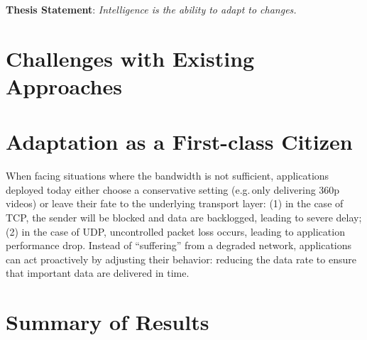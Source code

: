 \documentclass[thesis.tex]{subfiles}
\begin{document}
\vspace{1em}

\noindent\textbf{Thesis Statement}: \textit{Intelligence is the ability to adapt to
  changes.}

\vspace{1em}

\section{Challenges with Existing Approaches}
\label{sec:chall-with-exist}





\section{Adaptation as a First-class Citizen}
\label{sec:adaptation}

When facing situations where the bandwidth is not sufficient, applications
deployed today either choose a conservative setting (e.g.\,only delivering 360p
videos) or leave their fate to the underlying transport layer: (1) in the case
of TCP, the sender will be blocked and data are backlogged, leading to severe
delay; (2) in the case of UDP, uncontrolled packet loss occurs, leading to
application performance drop. Instead of ``suffering'' from a degraded network,
applications can act proactively by adjusting their behavior: reducing the data
rate to ensure that important data are delivered in time.




\section{Summary of Results}
\label{sec:summary-results-1}
\end{document}

